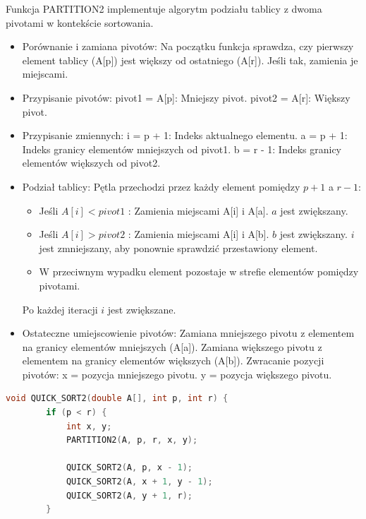 \documentclass{article}
\begin{document}
	Funkcja PARTITION2 implementuje algorytm podziału tablicy z dwoma pivotami w kontekście sortowania.
	\begin{itemize}
		\item Porównanie i zamiana pivotów:
		Na początku funkcja sprawdza, czy pierwszy element tablicy (A[p]) jest większy od ostatniego (A[r]). Jeśli tak, zamienia je miejscami. 
		
		\item Przypisanie pivotów:
		pivot1 = A[p]: Mniejszy pivot.
		pivot2 = A[r]: Większy pivot.
		
		\item Przypisanie zmiennych:
		i = p + 1: Indeks aktualnego elementu.
		a = p + 1: Indeks granicy elementów mniejszych od pivot1.
		b = r - 1: Indeks granicy elementów większych od pivot2.
		
		\item Podział tablicy:
		Pętla przechodzi przez każdy element pomiędzy \(p+1\) a \(r-1\):
		\begin{itemize}
			\item Jeśli $A[i] < pivot1$ :
			Zamienia miejscami A[i] i A[a].
			\(a\) jest zwiększany.
			\item Jeśli $A[i] > pivot2$ :
			Zamienia miejscami A[i] i A[b].
			\(b\) jest zwiększany.
			\(i\) jest zmniejszany, aby ponownie sprawdzić przestawiony element.
			\item W przeciwnym wypadku element pozostaje w strefie elementów pomiędzy pivotami.
		\end{itemize}
		Po każdej iteracji \(i\) jest zwiększane.
		
		\item Ostateczne umiejscowienie pivotów:
		Zamiana mniejszego pivotu z elementem na granicy elementów mniejszych (A[a]).
		Zamiana większego pivotu z elementem na granicy elementów większych (A[b]).
		Zwracanie pozycji pivotów:
		x = pozycja mniejszego pivotu.
		y = pozycja większego pivotu.
	\end{itemize}
	
	\begin{lstlisting}[language=C++, tabsize=3]
	void QUICK_SORT2(double A[], int p, int r) {
		if (p < r) {
			int x, y; 
			PARTITION2(A, p, r, x, y);
			
			QUICK_SORT2(A, p, x - 1);
			QUICK_SORT2(A, x + 1, y - 1);
			QUICK_SORT2(A, y + 1, r);
		}
			
		\end{lstlisting}
		
\end{document}
